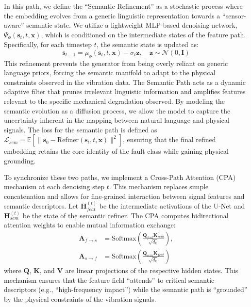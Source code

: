 \documentclass[journal]{IEEEtran}
\begin{document}
In this path, we define the ``Semantic Refinement'' as a stochastic process where the embedding evolves from a generic linguistic representation towards a ``sensor-aware'' semantic state. We utilize a lightweight MLP-based denoising network, $\Psi_\phi(\mathbf{s}_t, t, \mathbf{x})$, which is conditioned on the intermediate states of the feature path. Specifically, for each timestep $t$, the semantic state is updated as:
\begin{equation}
\mathbf{s}_{t-1} = \mu_\phi(\mathbf{s}_t, t, \mathbf{x}) + \sigma_t \mathbf{z}, \quad \mathbf{z} \sim \mathcal{N}(0, \mathbf{I})
\end{equation}
This refinement prevents the generator from being overly reliant on generic language priors, forcing the semantic manifold to adapt to the physical constraints observed in the vibration data. The Semantic Path acts as a dynamic adaptive filter that prunes irrelevant linguistic information and amplifies features relevant to the specific mechanical degradation observed. By modeling the semantic evolution as a diffusion process, we allow the model to capture the uncertainty inherent in the mapping between natural language and physical signals. The loss for the semantic path is defined as $\mathcal{L}_{sem} = \mathbb{E} [\| \mathbf{s}_0 - \text{Refiner}(\mathbf{s}_t, t, \mathbf{x}) \|^2]$, ensuring that the final refined embedding retains the core identity of the fault class while gaining physical grounding.

To synchronize these two paths, we implement a Cross-Path Attention (CPA) mechanism at each denoising step $t$. This mechanism replaces simple concatenation and allows for fine-grained interaction between signal features and semantic descriptors. Let $\mathbf{H}_{feat}^{(t)}$ be the intermediate activations of the U-Net and $\mathbf{H}_{sem}^{(t)}$ be the state of the semantic refiner. The CPA computes bidirectional attention weights to enable mutual information exchange:
\begin{align}
\mathbf{A}_{f \to s} &= \text{Softmax}\left(\frac{\mathbf{Q}_{feat} \mathbf{K}_{sem}^\top}{\sqrt{d_k}}\right), \\
\mathbf{A}_{s \to f} &= \text{Softmax}\left(\frac{\mathbf{Q}_{sem} \mathbf{K}_{feat}^\top}{\sqrt{d_k}}\right)
\end{align}
where $\mathbf{Q}$, $\mathbf{K}$, and $\mathbf{V}$ are linear projections of the respective hidden states. This mechanism ensures that the feature field ``attends'' to critical semantic descriptors (e.g., ``high-frequency impact'') while the semantic path is ``grounded'' by the physical constraints of the vibration signals.
\end{document}
